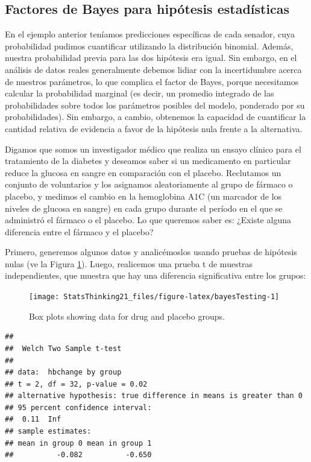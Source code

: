 \documentclass[
  12pt,
]{book}
\begin{document}
\hypertarget{factores-de-bayes-para-hipuxf3tesis-estaduxedsticas}{%
\subsection{Factores de Bayes para hipótesis estadísticas}\label{factores-de-bayes-para-hipuxf3tesis-estaduxedsticas}}

En el ejemplo anterior teníamos predicciones específicas de cada senador, cuya probabilidad pudimos cuantificar utilizando la distribución binomial. Además, nuestra probabilidad previa para las dos hipótesis era igual. Sin embargo, en el análisis de datos reales generalmente debemos lidiar con la incertidumbre acerca de nuestros parámetros, lo que complica el factor de Bayes, porque necesitamos calcular la probabilidad marginal (es decir, un promedio integrado de las probabilidades sobre todos los parámetros posibles del modelo, ponderado por su probabilidades). Sin embargo, a cambio, obtenemos la capacidad de cuantificar la cantidad relativa de evidencia a favor de la hipótesis nula frente a la alternativa.

Digamos que somos un investigador médico que realiza un ensayo clínico para el tratamiento de la diabetes y deseamos saber si un medicamento en particular reduce la glucosa en sangre en comparación con el placebo. Reclutamos un conjunto de voluntarios y los asignamos aleatoriamente al grupo de fármaco o placebo, y medimos el cambio en la hemoglobina A1C (un marcador de los niveles de glucosa en sangre) en cada grupo durante el período en el que se administró el fármaco o el placebo. Lo que queremos saber es: ¿Existe alguna diferencia entre el fármaco y el placebo?

Primero, generemos algunos datos y analicémoslos usando pruebas de hipótesis nulas (ve la Figura \ref{fig:bayesTesting}). Luego, realicemos una prueba t de muestras independientes, que muestra que hay una diferencia significativa entre los grupos:

\begin{figure}
\texttt{[image: StatsThinking21\_files/figure-latex/bayesTesting-1]} \caption{Box plots showing data for drug and placebo groups.}\label{fig:bayesTesting}
\end{figure}

\begin{verbatim}
## 
## 	Welch Two Sample t-test
## 
## data:  hbchange by group
## t = 2, df = 32, p-value = 0.02
## alternative hypothesis: true difference in means is greater than 0
## 95 percent confidence interval:
##  0.11  Inf
## sample estimates:
## mean in group 0 mean in group 1 
##          -0.082          -0.650
\end{verbatim}
\end{document}
